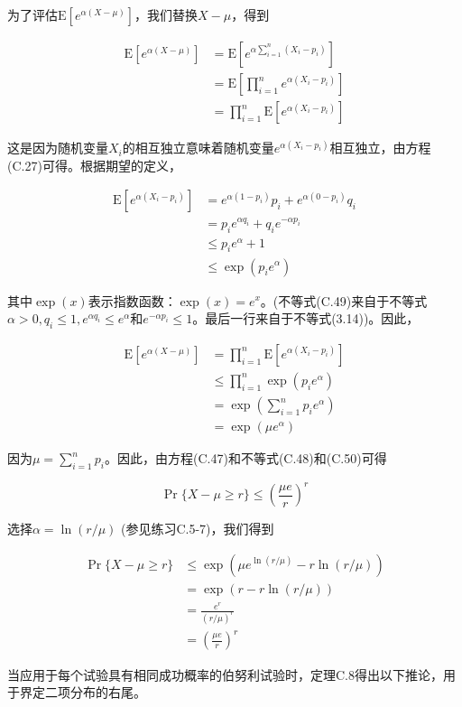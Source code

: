 \documentclass[lang=cn,newtx,10pt,scheme=chinese]{elegantbook}
\begin{document}
为了评估$\mathrm{E}[e^{\alpha(X-\mu)}]$，我们替换$X-\mu$，得到

$$
\begin{aligned}
\mathrm{E}[e^{\alpha(X-\mu)}] & =\mathrm{E}[e^{\alpha \sum_{i=1}^n(X_i-p_i)}] \\
& =\mathrm{E}[\prod_{i=1}^n e^{\alpha(X_i-p_i)}] \\
& =\prod_{i=1}^n \mathrm{E}[e^{\alpha(X_i-p_i)}]
\end{aligned}
$$

这是因为随机变量$X_i$的相互独立意味着随机变量$e^{\alpha(X_i-p_i)}$相互独立，由方程(C.27)可得。根据期望的定义，

$$
\begin{aligned}
\mathrm{E}[e^{\alpha(X_i-p_i)}] & =e^{\alpha(1-p_i)} p_i+e^{\alpha(0-p_i)} q_i \\
& =p_i e^{\alpha q_i}+q_i e^{-\alpha p_i} \\
& \leq p_i e^\alpha+1 \\
& \leq\exp(p_i e^\alpha)
\end{aligned}
$$

其中$\exp(x)$表示指数函数：$\exp(x)=e^x$。(不等式(C.49)来自于不等式$\alpha>0, q_i \leq 1, e^{\alpha q_i} \leq e^\alpha$和$e^{-\alpha p_i} \leq 1$。最后一行来自于不等式(3.14))。因此，

$$
\begin{aligned}
\mathrm{E}[e^{\alpha(X-\mu)}] & =\prod_{i=1}^n \mathrm{E}[e^{\alpha(X_i-p_i)}] \\
& \leq \prod_{i=1}^n \exp(p_i e^\alpha) \\
& =\exp (\sum_{i=1}^n p_i e^\alpha) \\
& =\exp (\mu e^\alpha)
\end{aligned}
$$

因为$\mu=\sum_{i=1}^n p_i$。因此，由方程(C.47)和不等式(C.48)和(C.50)可得

$$
\operatorname{Pr}\{X-\mu \geq r\} \leq (\frac{\mu e}{r})^r
$$

选择$\alpha=\ln (r / \mu)$ (参见练习C.5-7)，我们得到

$$
\begin{aligned}
\operatorname{Pr}\{X-\mu \geq r\} & \leq \exp (\mu e^{\ln (r / \mu)}-r \ln (r / \mu)) \\
& =\exp (r-r \ln (r / \mu)) \\
& =\frac{e^r}{(r / \mu)^r} \\
& =(\frac{\mu e}{r})^r
\end{aligned}
$$

当应用于每个试验具有相同成功概率的伯努利试验时，定理C.8得出以下推论，用于界定二项分布的右尾。
\end{document}
